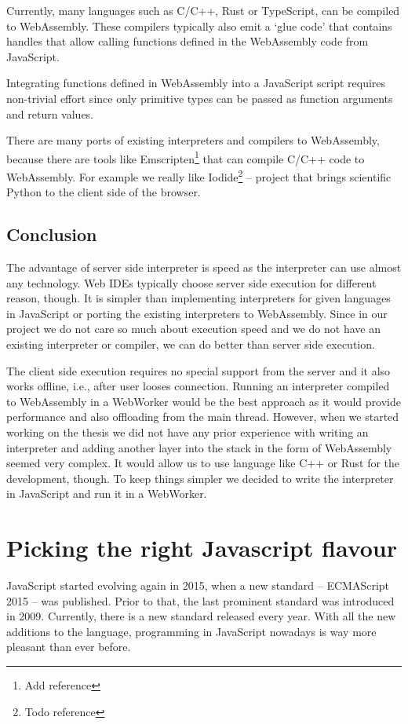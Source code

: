 Currently, many languages such as C/C++, Rust or TypeScript, can be compiled to WebAssembly. These compilers typically also emit
a `glue code' that contains handles that allow calling functions defined in the WebAssembly code from JavaScript.

Integrating functions defined in WebAssembly into a JavaScript script requires non-trivial effort since only primitive types can be passed
as function arguments and return values.

There are many ports of existing interpreters and compilers to WebAssembly, because there are tools like Emscripten\footnote{Add reference}
that can compile C/C++ code to WebAssembly. For example we really like Iodide\footnote{Todo reference} -- project that brings scientific Python
to the client side of the browser.

\subsection{Conclusion}
The advantage of server side interpreter is speed as the interpreter can use almost any technology. Web IDEs typically choose
server side execution for different reason, though. It is simpler than implementing interpreters for given languages in JavaScript or
porting the existing interpreters to WebAssembly. Since in our project we do not care so much about execution speed and
we do not have an existing interpreter or compiler, we can do better than server side execution.

The client side execution requires no special support from the server and it also works offline, i.e., after user looses connection. Running an interpreter
compiled to WebAssembly in a WebWorker would be the best approach as it would provide performance and also offloading from the main thread.
However, when we started working on the thesis we did not have any prior experience with writing an interpreter and adding another layer into the stack in the
form of WebAssembly seemed very complex. It would allow us to use language like C++ or Rust for the development, though. To keep things simpler we
decided to write the interpreter in JavaScript and run it in a WebWorker.

\section{Picking the right Javascript flavour}
JavaScript started evolving again in 2015, when a new standard -- ECMAScript 2015 -- was published. Prior to that, the last prominent
standard was introduced in 2009. Currently, there is a new standard released every year. With all the new additions to the language, programming in
JavaScript nowadays is way more pleasant than ever before.

